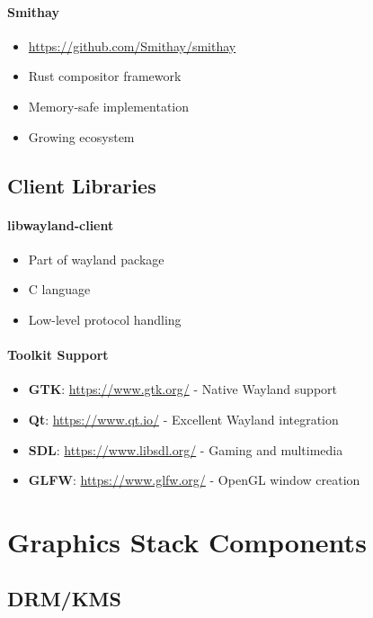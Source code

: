 \paragraph{Smithay}
\begin{itemize}
    \item \url{https://github.com/Smithay/smithay}
    \item Rust compositor framework
    \item Memory-safe implementation
    \item Growing ecosystem
\end{itemize}

\subsection{Client Libraries}

\paragraph{libwayland-client}
\begin{itemize}
    \item Part of wayland package
    \item C language
    \item Low-level protocol handling
\end{itemize}

\paragraph{Toolkit Support}
\begin{itemize}
    \item \textbf{GTK}: \url{https://www.gtk.org/} - Native Wayland support
    \item \textbf{Qt}: \url{https://www.qt.io/} - Excellent Wayland integration
    \item \textbf{SDL}: \url{https://www.libsdl.org/} - Gaming and multimedia
    \item \textbf{GLFW}: \url{https://www.glfw.org/} - OpenGL window creation
\end{itemize}

\section{Graphics Stack Components}

\subsection{DRM/KMS}

